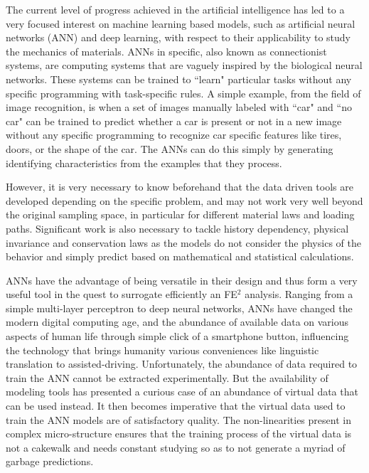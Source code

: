 The current level of progress achieved in the artificial intelligence has led to a very focused interest on machine learning based models, such as artificial neural networks (ANN) and deep learning, with respect to their applicability to study the mechanics of materials\cite{bessaFrameworkDatadrivenAnalysis2017,ghaboussiAutoprogressiveTrainingNeural1998,ungerNeuralNetworksMaterial2009,wangMultiscaleMultipermeabilityPoroplasticity2018}. ANNs in specific, also known as connectionist systems, are computing systems that are vaguely inspired by the biological neural networks\cite{chenDesignImplementationCloud2019}. These systems can be trained to ``learn" particular tasks without any specific programming with task-specific rules. A simple example, from the field of image recognition, is when a set of images manually labeled with ``car" and ``no car" can be trained to predict whether a car is present or not in a new image without any specific programming to recognize car specific features like tires, doors, or the shape of the car. The ANNs can do this simply by generating identifying characteristics from the examples that they process.

However, it is very necessary to know beforehand that the data driven tools are developed depending on the specific problem, and may not work very well beyond the original sampling space, in particular for different material laws and loading paths. Significant work is also necessary to tackle history dependency, physical invariance and conservation laws as the models do not consider the physics of the behavior and simply predict based on mathematical and statistical calculations.

ANNs have the advantage of being versatile in their design and thus form a very useful tool in the quest to surrogate efficiently an FE$^2$ analysis. Ranging from a simple multi-layer perceptron to deep neural networks\cite{haykinNeuralNetworksLearning2009}, ANNs have changed the modern digital computing age, and the abundance of available data on various aspects of human life through simple click of a smartphone button, influencing the technology that brings humanity various conveniences like linguistic translation to assisted-driving. Unfortunately, the abundance of data required to train the ANN cannot be extracted experimentally. But the availability of modeling tools has presented a curious case of an abundance of virtual data that can be used instead. It then becomes imperative that the virtual data used to train the ANN models are of satisfactory quality. The non-linearities present in complex micro-structure ensures that the training process of the virtual data is not a cakewalk and needs constant studying so as to not generate a myriad of garbage predictions\cite{rochaMicromechanicsbasedSurrogateModels2020}.

